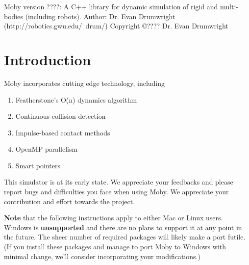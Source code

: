\documentclass[11pt, letterpaper]{article}
\begin{document}
\singlespacing
\noindent
Moby version ????: A C++ library for dynamic simulation of rigid and    multi-bodies (including robots).
\newline
\noindent
Author: Dr. Evan Drumwright (http://robotics.gwu.edu/~drum/)
\newline
\noindent
Copyright \copyright ???? Dr. Evan Drumwright
\section{Introduction}

\noindent
Moby incorporates cutting edge technology, including
\begin{enumerate}
\item Featherstone’s O(n) dynamics algorithm
\item Continuous collision detection
\item Impulse-based contact methods
\item OpenMP parallelism
\item Smart pointers
\end{enumerate}

This simulator is at its early state. We appreciate your feedbacks and please report bugs and difficulties you face when using Moby. We appreciate your contribution and effort towards the project.

{\bfseries Note} that the following instructions apply to either Mac or Linux users. Windows is {\bfseries unsupported} and there are no plans to support it at any point in the future. The sheer number of required packages will likely make a port futile. (If you install these packages and manage to port Moby to Windows with minimal change, we'll consider incorporating your modifications.)
\end{document}
